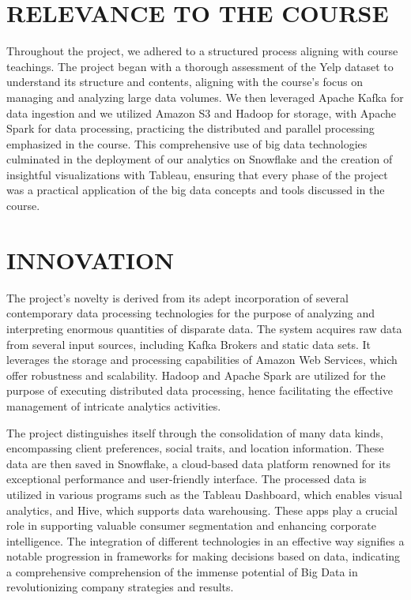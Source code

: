 \documentclass[conference]{IEEEtran}
\begin{document}
\section{RELEVANCE TO THE COURSE}
Throughout the project, we adhered to a structured process aligning with course teachings. The project began with a thorough assessment of the Yelp dataset to understand its structure and contents, aligning with the course's focus on managing and analyzing large data volumes. We then leveraged Apache Kafka for data ingestion and we utilized Amazon S3 and Hadoop for storage, with Apache Spark for data processing, practicing the distributed and parallel processing emphasized in the course. This comprehensive use of big data technologies culminated in the deployment of our analytics on Snowflake and the creation of insightful visualizations with Tableau, ensuring that every phase of the project was a practical application of the big data concepts and tools discussed in the course.




\section{INNOVATION}
The project's novelty is derived from its adept incorporation of several contemporary data processing technologies for the purpose of analyzing and interpreting enormous quantities of disparate data. The system acquires raw data from several input sources, including Kafka Brokers and static data sets. It leverages the storage and processing capabilities of Amazon Web Services, which offer robustness and scalability. Hadoop and Apache Spark are utilized for the purpose of executing distributed data processing, hence facilitating the effective management of intricate analytics activities. 

The project distinguishes itself through the consolidation of many data kinds, encompassing client preferences, social traits, and location information. These data are then saved in Snowflake, a cloud-based data platform renowned for its exceptional performance and user-friendly interface. The processed data is utilized in various programs such as the Tableau Dashboard, which enables visual analytics, and Hive, which supports data warehousing. These apps play a crucial role in supporting valuable consumer segmentation and enhancing corporate intelligence. The integration of different technologies in an effective way signifies a notable progression in frameworks for making decisions based on data, indicating a comprehensive comprehension of the immense potential of Big Data in revolutionizing company strategies and results.
\end{document}
